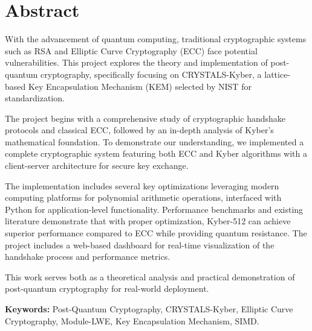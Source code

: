 \chapter*{Abstract}

With the advancement of quantum computing, traditional cryptographic systems such as RSA and Elliptic Curve Cryptography (ECC) face potential vulnerabilities. This project explores the theory and implementation of post-quantum cryptography, specifically focusing on CRYSTALS-Kyber, a lattice-based Key Encapsulation Mechanism (KEM) selected by NIST for standardization.

The project begins with a comprehensive study of cryptographic handshake protocols and classical ECC, followed by an in-depth analysis of Kyber's mathematical foundation. To demonstrate our understanding, we implemented a complete cryptographic system featuring both ECC and Kyber algorithms with a client-server architecture for secure key exchange.

The implementation includes several key optimizations leveraging modern computing platforms for polynomial arithmetic operations, interfaced with Python for application-level functionality. Performance benchmarks and existing literature demonstrate that with proper optimization, Kyber-512 can achieve superior performance compared to ECC while providing quantum resistance. The project includes a web-based dashboard for real-time visualization of the handshake process and performance metrics.

This work serves both as a theoretical analysis and practical demonstration of post-quantum cryptography for real-world deployment.

\vfill
\textbf{Keywords:} Post-Quantum Cryptography, CRYSTALS-Kyber, Elliptic Curve Cryptography, Module-LWE, Key Encapsulation Mechanism, SIMD.
\clearpage